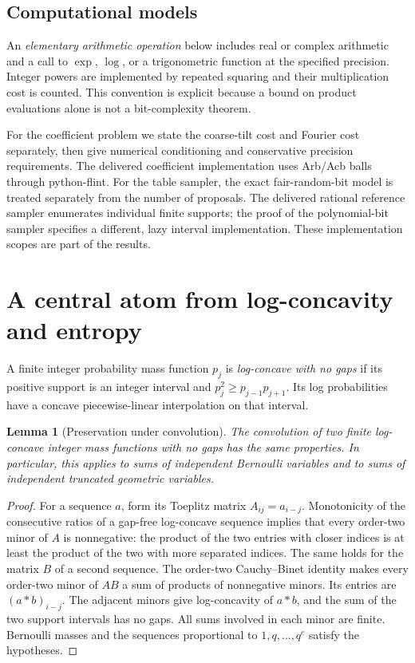 \documentclass[11pt,a4paper]{article}
\newtheorem{lemma}[theorem]{Lemma}
\theoremstyle{definition}
\begin{document}
\subsection{Computational models}

An \emph{elementary arithmetic operation} below includes real or complex arithmetic and a call to $\exp$, $\log$, or a trigonometric function at the specified precision. Integer powers are implemented by repeated squaring and their multiplication cost is counted. This convention is explicit because a bound on product evaluations alone is not a bit-complexity theorem.

For the coefficient problem we state the coarse-tilt cost and Fourier cost separately, then give numerical conditioning and conservative precision requirements. The delivered coefficient implementation uses Arb/Acb balls through python-flint. For the table sampler, the exact fair-random-bit model is treated separately from the number of proposals. The delivered rational reference sampler enumerates individual finite supports; the proof of the polynomial-bit sampler specifies a different, lazy interval implementation. These implementation scopes are part of the results.

\section{A central atom from log-concavity and entropy}\label{sec:entropy}

A finite integer probability mass function $p_j$ is \emph{log-concave with no gaps} if its positive support is an integer interval and $p_j^2\ge p_{j-1}p_{j+1}$. Its log probabilities have a concave piecewise-linear interpolation on that interval.

\begin{lemma}[Preservation under convolution]\label{lem:convolution}
The convolution of two finite log-concave integer mass functions with no gaps has the same properties. In particular, this applies to sums of independent Bernoulli variables and to sums of independent truncated geometric variables.
\end{lemma}
\begin{proof}
For a sequence $a$, form its Toeplitz matrix $A_{ij}=a_{i-j}$. Monotonicity of the consecutive ratios of a gap-free log-concave sequence implies that every order-two minor of $A$ is nonnegative: the product of the two entries with closer indices is at least the product of the two with more separated indices. The same holds for the matrix $B$ of a second sequence. The order-two Cauchy--Binet identity makes every order-two minor of $AB$ a sum of products of nonnegative minors. Its entries are $(a*b)_{i-j}$. The adjacent minors give log-concavity of $a*b$, and the sum of the two support intervals has no gaps. All sums involved in each minor are finite. Bernoulli masses and the sequences proportional to $1,q,\ldots,q^c$ satisfy the hypotheses.
\end{proof}
\end{document}
